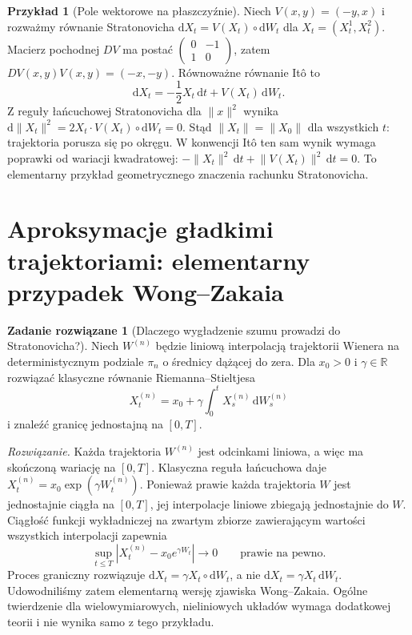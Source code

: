 \documentclass[11pt,a4paper,oneside]{report}
\numberwithin{equation}{chapter}
\theoremstyle{plain}
\theoremstyle{definition}
\newtheorem{przyklad}{Przykład}[chapter]
\newtheorem{zadanie}{Zadanie rozwiązane}[chapter]
\theoremstyle{remark}
\newcommand{\R}{\mathbb{R}}
\newcommand{\dd}{\mathrm{d}}
\newcommand{\norm}[1]{\lVert #1\rVert}
\begin{document}
\begin{przyklad}[Pole wektorowe na płaszczyźnie]
Niech $V(x,y)=(-y,x)$ i rozważmy równanie
Stratonovicha $\dd X_t=V(X_t)\circ\dd W_t$
dla $X_t=(X_t^1,X_t^2)$. Macierz pochodnej $DV$
ma postać $\left(\begin{smallmatrix}0&-1\\1&0\end{smallmatrix}\right)$,
zatem $DV(x,y)V(x,y)=(-x,-y)$.
Równoważne równanie Itô to
\[
\dd X_t=-\frac12X_t\,\dd t+V(X_t)\,\dd W_t.
\]
Z reguły łańcuchowej Stratonovicha dla $\norm{x}^2$
wynika $\dd\norm{X_t}^2=2X_t\cdot V(X_t)\circ\dd W_t=0$.
Stąd $\norm{X_t}=\norm{X_0}$ dla wszystkich $t$:
trajektoria porusza się po okręgu. W konwencji Itô
ten sam wynik wymaga poprawki od wariacji kwadratowej:
$-\norm{X_t}^2\,\dd t+\norm{V(X_t)}^2\,\dd t=0$.
To elementarny przykład geometrycznego znaczenia
rachunku Stratonovicha.
\end{przyklad}

\section{Aproksymacje gładkimi trajektoriami: elementarny przypadek Wong--Zakaia}
\begin{zadanie}[Dlaczego wygładzenie szumu prowadzi do Stratonovicha?]
Niech $W^{(n)}$ będzie liniową interpolacją
trajektorii Wienera na deterministycznym podziale
$\pi_n$ o średnicy dążącej do zera. Dla $x_0>0$
i $\gamma\in\R$ rozwiązać klasyczne równanie
Riemanna--Stieltjesa
\[
X_t^{(n)}=x_0+\gamma\int_0^t
X_s^{(n)}\,\dd W_s^{(n)}
\]
i znaleźć granicę jednostajną na $[0,T]$.

\emph{Rozwiązanie.} Każda trajektoria $W^{(n)}$
jest odcinkami liniowa, a więc ma skończoną wariację
na $[0,T]$. Klasyczna reguła łańcuchowa daje
$X_t^{(n)}=x_0\exp(\gamma W_t^{(n)})$.
Ponieważ prawie każda trajektoria $W$ jest
jednostajnie ciągła na $[0,T]$, jej interpolacje
liniowe zbiegają jednostajnie do $W$. Ciągłość
funkcji wykładniczej na zwartym zbiorze zawierającym
wartości wszystkich interpolacji zapewnia
\[
\sup_{t\le T}|X_t^{(n)}-x_0e^{\gamma W_t}|
\longrightarrow0\qquad\text{prawie na pewno}.
\]
Proces graniczny rozwiązuje
$\dd X_t=\gamma X_t\circ\dd W_t$,
a nie $\dd X_t=\gamma X_t\,\dd W_t$.
Udowodniliśmy zatem elementarną wersję zjawiska
Wong--Zakaia. Ogólne twierdzenie dla wielowymiarowych,
nieliniowych układów wymaga dodatkowej teorii i
nie wynika samo z tego przykładu.
\end{zadanie}
\end{document}
